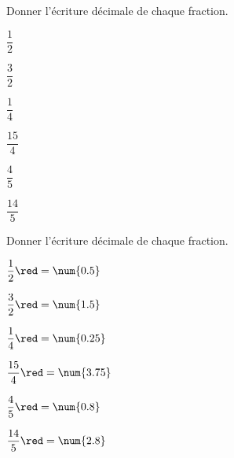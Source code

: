 \begin{exercice*}
    Donner l'écriture décimale de chaque fraction.
    \begin{multicols}{3}        
        \begin{enumerate}
            \begin{spacing}{1.5}
                \item $\dfrac{1}{2}$
                \item $\dfrac{3}{2}$
                \item $\dfrac{1}{4}$
                \item $\dfrac{15}{4}$
                \item $\dfrac{4}{5}$
                \item $\dfrac{14}{5}$              
            \end{spacing}
    \end{enumerate}         
    \end{multicols}
\end{exercice*}
\begin{corrige}
    Donner l'écriture décimale de chaque fraction.
    \begin{multicols}{3}        
        \begin{enumerate}
            \begin{spacing}{1.5}
                \item $\dfrac{1}{2} {\red = \num{0.5}}$
                \item $\dfrac{3}{2} {\red = \num{1.5}}$
                \item $\dfrac{1}{4} {\red = \num{0.25}}$
                \item $\dfrac{15}{4}{\red = \num{3.75}}$
                \item $\dfrac{4}{5} {\red = \num{0.8}}$
                \item $\dfrac{14}{5}{\red = \num{2.8}}$
            \end{spacing}
        \end{enumerate}        
    \end{multicols}
\end{corrige}

